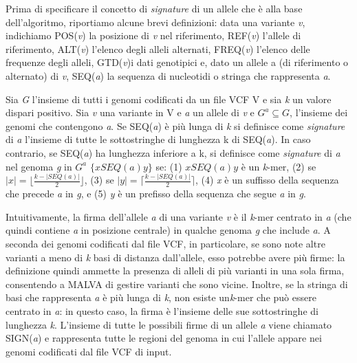 \documentclass[../main.tex]{subfiles}
\begin{document}
Prima di specificare il concetto di \textit{signature} di un allele che è alla base dell'algoritmo, riportiamo alcune brevi definizioni: data una variante \textit{v}, indichiamo POS(\textit{v}) la posizione di \textit{v} nel riferimento, REF(\textit{v}) l'allele di riferimento, ALT(\textit{v}) l'elenco degli alleli alternati, FREQ(\textit{v}) l'elenco delle frequenze degli alleli, GTD(\textit{v})i dati genotipici e, dato un allele a (di riferimento o alternato) di \textit{v}, SEQ(\textit{a}) la sequenza di nucleotidi o stringa che rappresenta \textit{a}.

\theoremstyle{definition}
\begin{definition} 

Sia \textit{G} l'insieme di tutti i genomi codificati da un file VCF V e sia \textit{k} un valore dispari positivo. Sia \textit{v} una variante in V e \textit{a} un allele di \textit{v} e $\textit{G}^{a} \subseteq \textit{G}$, l'insieme dei genomi che contengono \textit{a}. Se SEQ(\textit{a}) è più lunga di \textit{k} si definisce come \textit{signature} di \textit{a} l'insieme di tutte le sottostringhe di lunghezza k di SEQ(\textit{a}). In caso contrario, se SEQ(\textit{a}) ha lunghezza inferiore a k, si definisce come \textit{signature} di \textit{a} nel genoma \textit{g} in $\textit{G}^{a}$ $\{ \textit{x}SEQ(\textit{a})\textit{y} \} $ se: (1) $\textit{x}SEQ(\textit{a})\textit{y}$ è un \textit{k}-mer, (2) se $|\textit{x}| = \lfloor \frac{k-|SEQ(\textit{a})|}{2} \rfloor$, (3) se $|\textit{y}| = \lceil \frac{k-|SEQ(\textit{a})|}{2} \rceil$, (4) \textit{x} è un suffisso della sequenza che precede \textit{a} in \textit{g}, e (5) \textit{y} è un prefisso della sequenza che segue \textit{a} in \textit{g}.

\end{definition}

\noindent
Intuitivamente, la firma dell'allele \textit{a} di una variante \textit{v} è il \textit{k}-mer centrato in \textit{a} (che quindi contiene \textit{a} in posizione centrale) in qualche genoma \textit{g} che include \textit{a}. A seconda dei genomi codificati dal file VCF, in particolare, se sono note altre varianti a meno di \textit{k} basi di distanza dall'allele, esso potrebbe avere più firme: la definizione quindi ammette la presenza di alleli di più varianti in una sola firma, consentendo a MALVA di gestire varianti che sono vicine. Inoltre, se la stringa di basi che rappresenta \textit{a} è più lunga di \textit{k}, non esiste un\textit{k}-mer che può essere centrato in \textit{a}: in questo caso, la firma è l'insieme delle sue sottostringhe di lunghezza \textit{k}. L'insieme di tutte le possibili firme di un allele \textit{a} viene chiamato SIGN(\textit{a}) e rappresenta tutte le regioni del genoma in cui l'allele appare nei genomi codificati dal file VCF di input.
\end{document}
